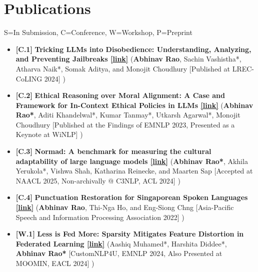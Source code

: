 \documentclass[11pt,letterpaper]{article}
\begin{document}
    \section*{Publications}
    \small{S=In Submission, C=Conference, W=Workshop, P=Preprint}
    
    \begin{itemize}[leftmargin=*,label={},itemsep=4pt]
        \item {\color{maincolor}\textbf{[C.1]}} \textbf{Tricking LLMs into Disobedience: Understanding, Analyzing,
                and Preventing Jailbreaks \href{https://aclanthology.org/2024.lrec-main.1462/}{[link]}}  (\textbf{Abhinav Rao}, Sachin Vashistha*, Atharva Naik*, Somak Aditya, and Monojit Choudhury
            [Published at LREC-CoLING 2024]
        )
           
        \item {\color{maincolor}\textbf{[C.2]}} \textbf{Ethical Reasoning over Moral Alignment: A Case and
                Framework for In-Context Ethical Policies in LLMs \href{https://aclanthology.org/2023.findings-emnlp.892/}{[link]}}  (\textbf{Abhinav Rao*}, Aditi Khandelwal*, Kumar Tanmay*, Utkarsh Agarwal*, Monojit Choudhury
            [Published at the Findings of EMNLP 2023, Presented as a Keynote at WiNLP]
        )
           
        \item {\color{maincolor}\textbf{[C.3]}} \textbf{Normad: A benchmark for measuring the cultural
                adaptability of large language models \href{https://arxiv.org/abs/2404.12464}{[link]}}  (\textbf{Abhinav Rao*}, Akhila Yerukola*, Vishwa Shah, Katharina Reinecke, and Maarten Sap
            [Accepted at NAACL 2025, Non-archivally @ C3NLP, ACL 2024]
        )
           
        \item {\color{maincolor}\textbf{[C.4]}} \textbf{Punctuation Restoration for Singaporean Spoken
                Languages \href{https://arxiv.org/abs/2212.05356}{[link]}}  (\textbf{Abhinav Rao}, Thi-Nga Ho, and Eng-Siong Chng
            [Asia-Pacific Speech and Information Processing Association 2022]
        )
           
        \item {\color{maincolor}\textbf{[W.1]}} \textbf{Less is Fed More: Sparsity Mitigates Feature Distortion in
                Federated Learning \href{https://aclanthology.org/2024.customnlp4u-1.4/}{[link]}}  (Aashiq Muhamed*, Harshita Diddee*, \textbf{Abhinav Rao*}
            [CustomNLP4U, EMNLP 2024, Also Presented at MOOMIN, EACL 2024]
        )
           

\end{itemize}
\end{document}
